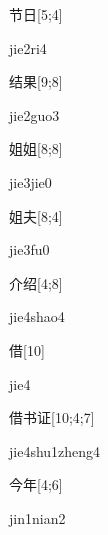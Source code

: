 \begin{verbete}[jie2ri4]{节日}[5;4]
\begin{pronuncia}{jie2ri4}
\end{pronuncia}
\end{verbete}

\begin{verbete}{结果}[9;8]
\begin{pronuncia}{jie2guo3}
\end{pronuncia}
\end{verbete}

\begin{verbete}{姐姐}[8;8]
\begin{pronuncia}{jie3jie0}
\end{pronuncia}
\end{verbete}

\begin{verbete}[jie3fu0]{姐夫}[8;4]
\begin{pronuncia}{jie3fu0}
\end{pronuncia}
\end{verbete}

\begin{verbete}{介绍}[4;8]
\begin{pronuncia}{jie4shao4}
\end{pronuncia}
\end{verbete}

\begin{verbete}[jie4]{借}[10]
\begin{pronuncia}{jie4}
\end{pronuncia}
\end{verbete}

\begin{verbete}{借书证}[10;4;7]
\begin{pronuncia}{jie4shu1zheng4}
\end{pronuncia}
\end{verbete}

\begin{verbete}{今年}[4;6]
\begin{pronuncia}{jin1nian2}
\end{pronuncia}
\end{verbete}

